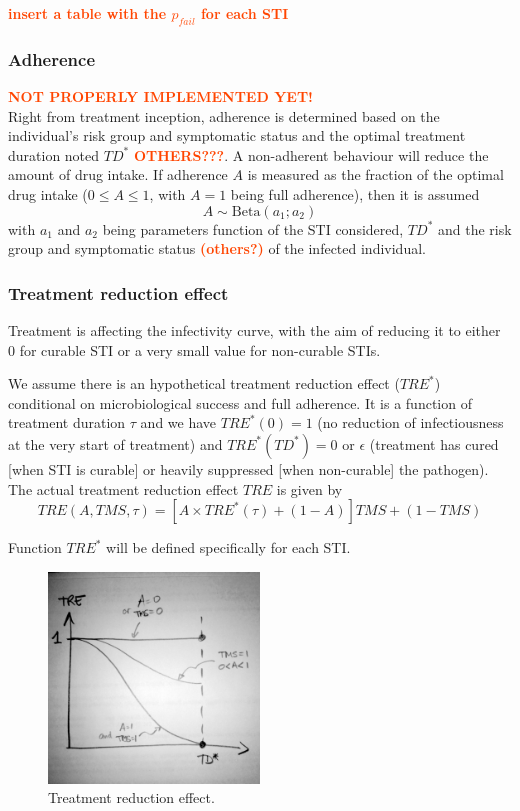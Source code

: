 \documentclass[11pt, onecolumn]{article}
\newcommand{\warning}[1]{\textbf{\textcolor{OrangeRed}{#1}}}
\begin{document}
\warning{insert a table with the $p_{fail}$ for each STI}

\subsubsection{Adherence}
\warning{NOT PROPERLY IMPLEMENTED YET!}\\
Right from treatment inception, adherence is determined based on the individual's risk group and symptomatic status and the optimal treatment duration noted $TD^*$ \warning{OTHERS???}. A non-adherent behaviour will reduce the amount of drug intake. If adherence $A$ is measured as the fraction of the optimal drug intake ($0 \leq A\leq 1$, with $A=1$ being full adherence), then it is assumed
$$ A \sim \mathrm{Beta}(a_1; a_2)$$
with $a_1$ and $a_2$ being parameters function of the STI considered, $TD^*$ and the risk group and symptomatic status \warning{(others?)} of the infected individual.


\subsubsection{Treatment reduction effect}

Treatment is affecting the infectivity curve, with the aim of reducing it to either 0 for curable STI or a very small value for non-curable STIs. 

We assume there is an hypothetical treatment reduction effect ($TRE^*$) conditional on microbiological success and full adherence. It is a function of treatment duration $\tau$ and we have $TRE^*(0)=1$ (no reduction of infectiousness at the very start of treatment) and $TRE^*(TD^*)=0$ or $\epsilon$ (treatment has cured [when STI is curable] or heavily suppressed [when non-curable] the pathogen). The actual treatment reduction effect $TRE$ is given by
$$TRE(A, TMS,\tau) = \left[A\times TRE^*(\tau) + (1-A) \right] TMS + (1-TMS) $$

Function $TRE^*$ will be defined specifically for each STI.

\begin{figure}[!ht]
\centering
    \includegraphics[angle=0,width=0.5\textwidth]{TRE.JPG}
\caption{Treatment reduction effect.}
\label{fig:TRE}
\end{figure}
\end{document}
